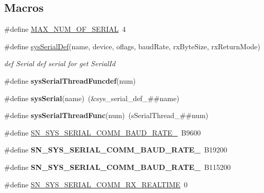 \subsection*{Macros}
\begin{DoxyCompactItemize}
\item 
\#define \hyperlink{group__SYSTEM__SERIAL__COMM_gab19b7880962ae52d90f784158f56f9f5}{M\+A\+X\+\_\+\+N\+U\+M\+\_\+\+O\+F\+\_\+\+S\+E\+R\+I\+AL}~4
\item 
\#define \hyperlink{group__SYSTEM__SERIAL__COMM_ga0e2406f7554f78b285eaccd1513fe392}{sys\+Serial\+Def}(name,  device,  oflags,  baud\+Rate,  rx\+Byte\+Size,  rx\+Return\+Mode)
\begin{DoxyCompactList}\small\item\em def Serial def serial for get Serial\+Id \end{DoxyCompactList}\item 
\#define {\bfseries sys\+Serial\+Thread\+Funcdef}(num)
\item 
\mbox{\label{group__SYSTEM__SERIAL__COMM_ga045c8c8025b6e2de3de32a5315da2766}} 
\#define {\bfseries sys\+Serial}(name)~(\&sys\+\_\+serial\+\_\+def\+\_\+\#\#name)
\item 
\mbox{\label{group__SYSTEM__SERIAL__COMM_ga7aed45ffffd42f5cd8fa50f8ae3af2cd}} 
\#define {\bfseries sys\+Serial\+Thread\+Func}(num)~(s\+Serial\+Thread\+\_\+\#\#num)
\item 
\#define \hyperlink{group__SYSTEM__SERIAL__COMM_ga8ef896af26917008892ad9f98480cced}{S\+N\+\_\+\+S\+Y\+S\+\_\+\+S\+E\+R\+I\+A\+L\+\_\+\+C\+O\+M\+M\+\_\+\+B\+A\+U\+D\+\_\+\+R\+A\+T\+E\+\_}~B9600
\item 
\mbox{\label{group__SYSTEM__SERIAL__COMM_gabbea68264d49ba7b3fd3ea0af2d5871d}} 
\#define {\bfseries S\+N\+\_\+\+S\+Y\+S\+\_\+\+S\+E\+R\+I\+A\+L\+\_\+\+C\+O\+M\+M\+\_\+\+B\+A\+U\+D\+\_\+\+R\+A\+T\+E\+\_}~B19200
\item 
\mbox{\label{group__SYSTEM__SERIAL__COMM_gac225ef6708a36c14757361c4f496f218}} 
\#define {\bfseries S\+N\+\_\+\+S\+Y\+S\+\_\+\+S\+E\+R\+I\+A\+L\+\_\+\+C\+O\+M\+M\+\_\+\+B\+A\+U\+D\+\_\+\+R\+A\+T\+E\+\_}~B115200
\item 
\#define \hyperlink{group__SYSTEM__SERIAL__COMM_ga45345dabcfb671abba160a3dac350670}{S\+N\+\_\+\+S\+Y\+S\+\_\+\+S\+E\+R\+I\+A\+L\+\_\+\+C\+O\+M\+M\+\_\+\+R\+X\+\_\+\+R\+E\+A\+L\+T\+I\+ME}~0

\end{DoxyCompactItemize}

